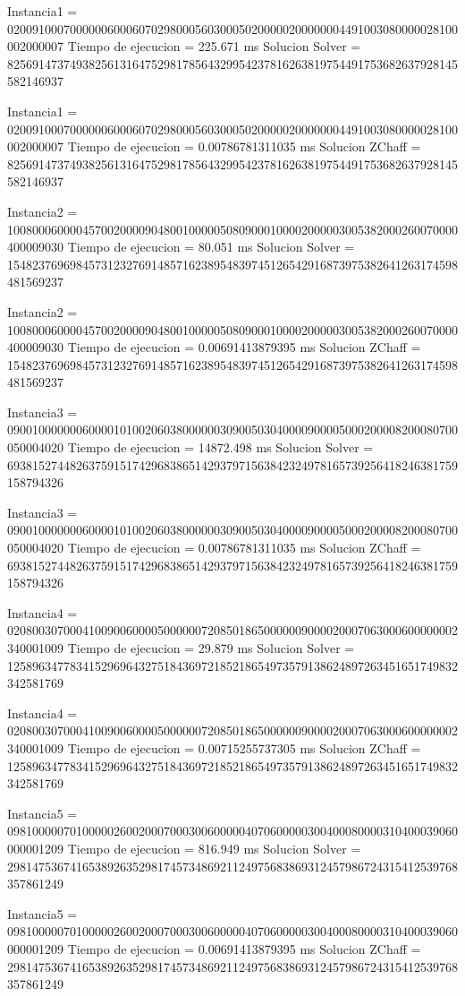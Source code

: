 Instancia1 = 020091000700000060006070298000560300050200000200000004491003080000028100002000007
Tiempo de ejecucion = 225.671 ms
Solucion Solver = 825691473749382561316475298178564329954237816263819754491753682637928145582146937

Instancia1 = 020091000700000060006070298000560300050200000200000004491003080000028100002000007
Tiempo de ejecucion = 0.00786781311035 ms
Solucion ZChaff = 825691473749382561316475298178564329954237816263819754491753682637928145582146937

Instancia2 = 100800060000457002000090480010000050809000100002000003005382000260070000400009030
Tiempo de ejecucion = 80.051 ms
Solucion Solver = 154823769698457312327691485716238954839745126542916873975382641263174598481569237

Instancia2 = 100800060000457002000090480010000050809000100002000003005382000260070000400009030
Tiempo de ejecucion = 0.00691413879395 ms
Solucion ZChaff = 154823769698457312327691485716238954839745126542916873975382641263174598481569237

Instancia3 = 090010000000600001010020603800000030900503040000900005000200008200080700050004020
Tiempo de ejecucion = 14872.498 ms
Solucion Solver = 693815274482637591517429683865142937971563842324978165739256418246381759158794326

Instancia3 = 090010000000600001010020603800000030900503040000900005000200008200080700050004020
Tiempo de ejecucion = 0.00786781311035 ms
Solucion ZChaff = 693815274482637591517429683865142937971563842324978165739256418246381759158794326

Instancia4 = 020800307000410090060000500000072085018650000009000020007063000600000002340001009
Tiempo de ejecucion = 29.879 ms
Solucion Solver = 125896347783415296964327518436972185218654973579138624897263451651749832342581769

Instancia4 = 020800307000410090060000500000072085018650000009000020007063000600000002340001009
Tiempo de ejecucion = 0.00715255737305 ms
Solucion ZChaff = 125896347783415296964327518436972185218654973579138624897263451651749832342581769

Instancia5 = 098100000701000002600200070003006000004070600000300400080000310400039060000001209
Tiempo de ejecucion = 816.949 ms
Solucion Solver = 298147536741653892635298174573486921124975683869312457986724315412539768357861249

Instancia5 = 098100000701000002600200070003006000004070600000300400080000310400039060000001209
Tiempo de ejecucion = 0.00691413879395 ms
Solucion ZChaff = 298147536741653892635298174573486921124975683869312457986724315412539768357861249

